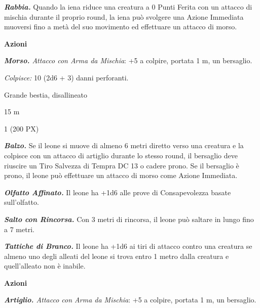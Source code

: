 \begin{multicols}{2}
{\emph{\textbf{Rabbia.}} Quando la iena riduce una creatura a 0 Punti Ferita con un attacco di mischia durante il proprio round, la iena può svolgere una Azione Immediata muoversi fino a metà del suo movimento ed effettuare un attacco di morso.

\textbf{Azioni}

\emph{\textbf{Morso.} Attacco con Arma da Mischia}: +5 a colpire, portata 1 m, un bersaglio.

\emph{Colpisce:} 10 (2d6 + 3) danni perforanti.

\begin{description}[noitemsep, topsep=0pt, parsep=0pt, partopsep=0pt, itemsep=1pt, leftmargin=2.35cm,  labelwidth=2.2cm, itemindent=0cm, listparindent=0pt] %
\setlength{\baselineskip}{10pt}
\item[\textbf{Taglia/Tipo}] Grande bestia, disallineato
\item[\textbf{Caratt.}] 
\item[\textbf{Punti Ferita}] 
\item[\textbf{Tiri Salvez.}] 
\item[\textbf{Movimento}] 15 m
\item[\textbf{Sfida}] 1 (200 PX)
\end{description}
\smallskip

\emph{\textbf{Balzo.}} Se il leone si muove di almeno 6 metri diretto verso una creatura e la colpisce con un attacco di artiglio durante lo stesso round, il bersaglio deve riuscire un Tiro Salvezza di Tempra DC 13 o cadere prono. Se il bersaglio è prono, il leone può effettuare un attacco di morso come Azione Immediata.

\emph{\textbf{Olfatto Affinato.}} Il leone ha +1d6 alle prove di Consapevolezza basate sull'olfatto.

\emph{\textbf{Salto con Rincorsa.}} Con 3 metri di rincorsa, il leone può saltare in lungo fino a 7 metri.

\emph{\textbf{Tattiche di Branco.}} Il leone ha +1d6 ai tiri di attacco contro una creatura se almeno uno degli alleati del leone si trova entro 1 metro dalla creatura e quell'alleato non è inabile.

\textbf{Azioni}

\emph{\textbf{Artiglio.} Attacco con Arma da Mischia}: +5 a colpire, portata 1 m, un bersaglio.

}
\end{multicols}
